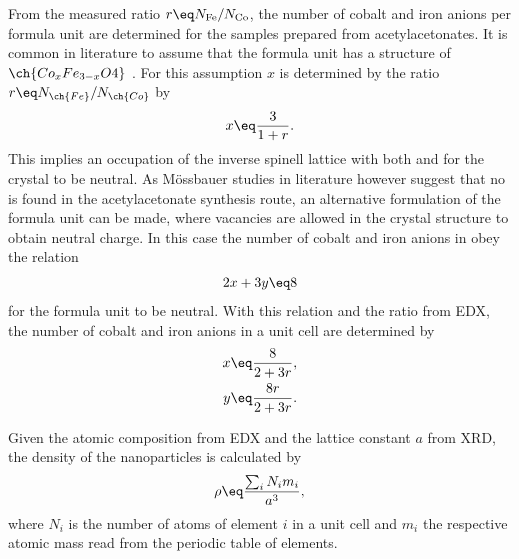 \documentclass[\main/dresen_thesis.tex]{subfiles}
\begin{document}
    From the measured ratio $r \eq N_\mathrm{Fe} / N_\mathrm{Co}$, the number of cobalt and iron anions per formula unit are determined for the samples prepared from acetylacetonates.
    It is common in literature to assume that the formula unit has a structure of $\ch{Co_x Fe_{3-x} O4}$ \cite{Wu_2014_Monol, Sathya_2016_Cofeo}.
    For this assumption $x$ is determined by the ratio $r \eq N_{\ch{Fe}} / N_{\ch{Co}}$ by
    \begin{align}
      x \eq \frac{3}{1 + r}.
    \end{align}
    This implies an occupation of the inverse spinell lattice with both  and  for the crystal to be neutral.
    As M\"ossbauer studies in literature however suggest that no  is found in the acetylacetonate synthesis route, an alternative formulation of the formula unit can be made, where vacancies are allowed in the crystal structure to obtain neutral charge.
    In this case the number of cobalt and iron anions in  obey the relation
    \begin{align}
      2 x + 3 y \eq 8
    \end{align}
    for the formula unit to be neutral.
    With this relation and the ratio from EDX, the number of cobalt and iron anions in a unit cell are determined by
    \begin{align}
      x \eq \frac{8}{2 + 3r},\\
      y \eq \frac{8r}{2 + 3r}.
    \end{align}

    Given the atomic composition from EDX and the lattice constant $a$ from XRD, the density of the nanoparticles is calculated by
    \begin{align}
      \rho \eq \frac{\sum_i N_i m_i}{a^3},
    \end{align}
    where $N_i$ is the number of atoms of element $i$ in a unit cell and $m_i$ the respective atomic mass read from the periodic table of elements.
\end{document}
